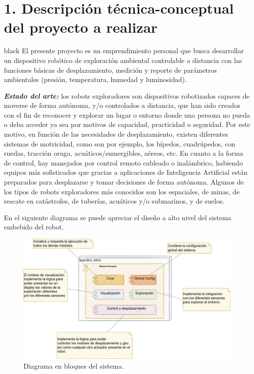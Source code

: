 \documentclass[
11pt, %
]{charter}
\begin{document}
\section{1. Descripción técnica-conceptual del proyecto a realizar}
\label{sec:descripcion}

\begin{consigna}{black} %
El presente proyecto es un emprendimiento personal que busca desarrollar un dispositivo robótico de exploración ambiental controlable a distancia con las funciones básicas de desplazamiento, medición y reporte de parámetros ambientales (presión, temperatura, humedad y luminosidad).

\textit{\textbf{Estado del arte:}}
los robots exploradores son dispositivos robotizados capaces de moverse de forma autónoma, y/o controlados a distancia, que han sido creados con el fin de reconocer y explorar un lugar o entorno donde una persona no pueda o deba acceder ya sea por motivos de capacidad, practicidad o seguridad. Por este motivo, en función de las necesidades de desplazamiento, existen diferentes sistemas de motricidad, como son por ejemplo, los bípedos, cuadrúpedos, con ruedas, tracción oruga, acuáticos/sumergibles, aéreos, etc. En cuanto a la forma de control, hay manejados por control remoto cableado o inalámbrico, habiendo equipos más sofisticados que gracias a aplicaciones de Inteligencia Artificial están preparados para desplazarse y tomar decisiones de forma autónoma.
Algunos de los tipos de robots exploradores más conocidos son los espaciales, de minas, de rescate en catástrofes, de tuberías, acuáticos y/o submarinos, y de suelos.

En el siguiente diagrama se puede apreciar el diseño a alto nivel del sistema embebido del robot.

\begin{figure}[htpb]
\centering 
\includegraphics[width=.9\textwidth]{./Figuras/ProyectoFinal-Page-7.jpg}
\caption{Diagrama en bloques del sistema.}
\label{fig:diagBloques}
\end{figure}

\vspace{25px}


\end{consigna}
\end{document}
